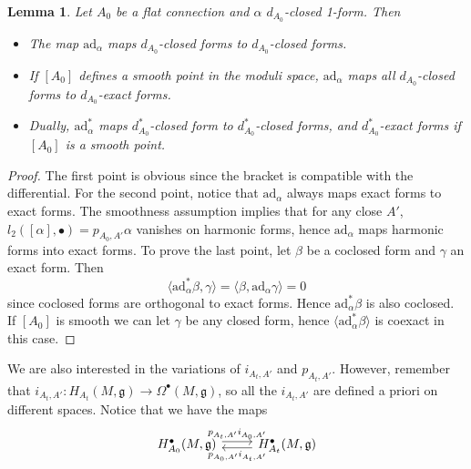 \documentclass[11pt,a4paper]{amsart}
\theoremstyle{plain} %
\newtheorem{lem}[thm]{Lemma}
\theoremstyle{definition}
\theoremstyle{remark}
\newcommand{\g}{\mathfrak{g}}
\newcommand{\dd}{d}
\newcommand{\mr}{\mathrm}
\begin{document}
\begin{lem}\label{lem:ad_alpha}
Let $A_0$ be a flat connection and $\alpha$ $d_{A_0}$-closed 1-form. Then 
\begin{itemize}
\item The map $\mathrm{ad}_\alpha$ maps $\dd_{A_0}$-closed forms to $\dd_{A_0}$-closed forms. 
\item If $[A_0]$ defines a smooth point in the moduli space, $\mr{ad}_\alpha$ maps all $\dd_{A_0}$-closed forms to $\dd_{A_0}$-\emph{exact} forms. 
\item Dually, $\mathrm{ad}^*_\alpha$ maps $\dd^*_{A_0}$-closed form to $\dd^*_{A_0}$-closed forms, and $\dd^*_{A_0}$-exact forms if $[A_0] $ is a smooth point. 
\end{itemize}
\end{lem}
\begin{proof}
The first point is obvious since the bracket is compatible with the differential. For the second point, notice that $\mathrm{ad}_\alpha$ always maps exact forms to exact forms. The smoothness assumption implies that for any close $A'$,  $l_2([\alpha],\bullet) = p_{A_0,A'}\alpha$ vanishes on harmonic forms, hence $\mathrm{ad}_\alpha$ maps harmonic forms into exact forms. To prove the last point, let $\beta$ be a coclosed form and $\gamma$ an exact form. Then 
$$\langle\mathrm{ad}^*_\alpha\beta, \gamma \rangle = \langle \beta,\mathrm{ad}_\alpha\gamma\rangle = 0$$ 
since coclosed forms are orthogonal to exact forms. Hence $\mathrm{ad}^*_\alpha\beta$ is also coclosed. If $[A_0]$ is smooth we can let $\gamma$ be any closed form, hence $\langle \mathrm{ad}_\alpha^*\beta\rangle$ is coexact in this case.  
\end{proof}
We are also interested in the variations of $i_{A_t,A'}$ and $p_{A_t,A'}$. However, remember that $i_{A_t,A'} \colon H_{A_t}(M,\g) \to \Omega^\bullet(M,\g)$, so all the $i_{A_t,A'}$ are defined a priori on different spaces. Notice that we have the maps  
   \begin{equation}
 \begin{tikzcd}[every arrow/.append style={shift left}]
 {H^\bullet_{A_0}(M,\mathfrak{g})} \arrow{r}{p_{A_t,A'}i_{A_0,A'}} &{H^\bullet_{A_t}(M,\mathfrak{g})}  \arrow{l}{p_{A_0,A'} i_{A_t,A'}} 
 \end{tikzcd}\label{eq:Hmaps}
   \end{equation}
   
\end{document}
